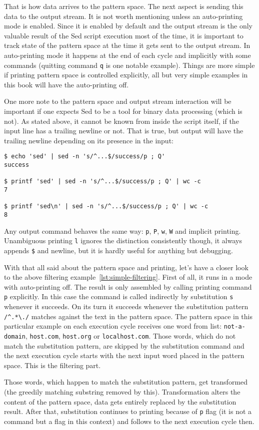 That is how data arrives to the pattern space. The next aspect is
sending this data to the output stream. It is not worth mentioning
unless an auto-printing mode is enabled.
Since it is enabled by default and the output stream is the
only valuable result of the Sed script execution most of the time,
it is important to track state of the pattern space at the time
it gets sent to the output stream.
In auto-printing mode it happens at the end of each cycle and
implicitly with some commands (quitting command
\lstinline{q} is one notable example).
Things are more simple if printing pattern space is controlled
explicitly, all but very simple examples in this book will have
the auto-printing off.

One more note to the pattern space and output stream interaction
will be important if one expects Sed to be a tool for binary
data processing (which is not). As stated above, it cannot be
known from inside the script itself, if the input line has
a trailing newline or not. That is true, but output will have
the trailing newline depending on its presence in the input:
\begin{lstlisting}
$ echo 'sed' | sed -n 's/^...$/success/p ; Q'    
success

$ printf 'sed' | sed -n 's/^...$/success/p ; Q' | wc -c
7

$ printf 'sed\n' | sed -n 's/^...$/success/p ; Q' | wc -c
8
\end{lstlisting}
Any output command behaves the same way: \lstinline{p},
\lstinline{P}, \lstinline{w}, \lstinline{W} and
implicit printing.
Unambiguous printing \lstinline{l} ignores the distinction
consistently though, it always appends \lstinline{$} and newline,
but it is hardly useful for anything but debugging.

With that all said about the pattern space and printing, let's have
a closer look to the above filtering example~\ref{lst:simple-filtering}.
First of all, it runs in a mode with auto-printing off.
The result is only assembled by calling printing command
\lstinline{p} explicitly. In this case the command is
called indirectly by substitution \lstinline{s} whenever
it succeeds. On its turn it succeeds whenever the
substitution pattern \lstinline{/^.*\./} matches against
the text in the pattern space. The pattern space in this
particular example on each execution cycle receives one
word from list:
\lstinline{not-a-domain}, \lstinline{host.com},
\lstinline{host.org} or \lstinline{localhost.com}.
Those words, which do not match the substitution pattern,
are skipped by the substitution command and the next
execution cycle starts with the next input word placed
in the pattern space. This is the filtering part.

Those words, which happen to match the substitution pattern,
get transformed (the greedily matching substring removed
by this).
Transformation alters the content of the pattern space,
data gets entirely replaced by the substitution result.
After that, substitution continues to printing because of
\lstinline{p} flag (it is not a command but a flag in this
context) and follows to the next execution cycle then.
